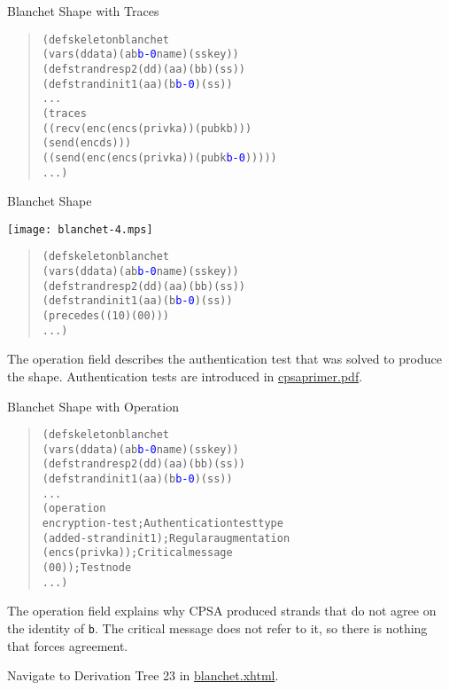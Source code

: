 \documentclass[landscape]{slides}
\newcommand{\cpsa}{CPSA}
\begin{document}
\begin{mitreslide}{Blanchet Shape with Traces}
\begin{quote}
\begin{alltt}
(defskeleton blanchet
  (vars (d data) (a b \textcolor{blue}{b-0} name) (s skey))
  (defstrand resp 2 (d d) (a a) (b b) (s s))
  (defstrand init 1 (a a) (b \textcolor{blue}{b-0}) (s s))
  ...
  (traces
    ((recv (enc (enc s (privk a)) (pubk b)))
     (send (enc d s)))
    ((send (enc (enc s (privk a)) (pubk \textcolor{blue}{b-0})))))
  ...)
\end{alltt}
\end{quote}
\end{mitreslide}

\begin{mitreslide}{Blanchet Shape}
\begin{center}
\texttt{[image: blanchet-4.mps]}
\end{center}
\begin{quote}
\begin{alltt}
(defskeleton blanchet
  (vars (d data) (a b \textcolor{blue}{b-0} name) (s skey))
  (defstrand resp 2 (d d) (a a) (b b) (s s))
  (defstrand init 1 (a a) (b \textcolor{blue}{b-0}) (s s))
  (precedes ((1 0) (0 0)))
  ...)
\end{alltt}
\end{quote}
\end{mitreslide}

\begin{note}
  The operation field describes the authentication test that was
  solved to produce the shape.  Authentication tests are introduced in
  \url{cpsaprimer.pdf}.
\end{note}

\begin{mitreslide}{Blanchet Shape with Operation}
\begin{quote}
\begin{alltt}
(defskeleton blanchet
  (vars (d data) (a b \textcolor{blue}{b-0} name) (s skey))
  (defstrand resp 2 (d d) (a a) (b b) (s s))
  (defstrand init 1 (a a) (b \textcolor{blue}{b-0}) (s s))
  ...
  (operation
    encryption-test       ; Authentication test type
    (added-strand init 1) ; Regular augmentation
    (enc s (privk a))     ; Critical message
    (0 0))                ; Test node
  ...)
\end{alltt}
\end{quote}
\end{mitreslide}

\begin{note}
  The operation field explains why {\cpsa} produced strands that do
  not agree on the identity of \texttt{b}.  The critical message does
  not refer to it, so there is nothing that forces agreement.

  Navigate to Derivation Tree 23 in \url{blanchet.xhtml}.
\end{note}
\end{document}
